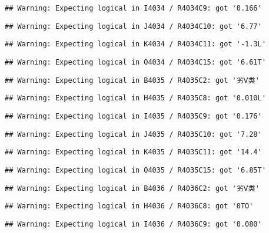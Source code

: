 \documentclass[
]{article}
\begin{document}
\begin{verbatim}
## Warning: Expecting logical in I4034 / R4034C9: got '0.166'
\end{verbatim}

\begin{verbatim}
## Warning: Expecting logical in J4034 / R4034C10: got '6.77'
\end{verbatim}

\begin{verbatim}
## Warning: Expecting logical in K4034 / R4034C11: got '-1.3L'
\end{verbatim}

\begin{verbatim}
## Warning: Expecting logical in O4034 / R4034C15: got '6.61T'
\end{verbatim}

\begin{verbatim}
## Warning: Expecting logical in B4035 / R4035C2: got '劣Ⅴ类'
\end{verbatim}

\begin{verbatim}
## Warning: Expecting logical in H4035 / R4035C8: got '0.010L'
\end{verbatim}

\begin{verbatim}
## Warning: Expecting logical in I4035 / R4035C9: got '0.176'
\end{verbatim}

\begin{verbatim}
## Warning: Expecting logical in J4035 / R4035C10: got '7.28'
\end{verbatim}

\begin{verbatim}
## Warning: Expecting logical in K4035 / R4035C11: got '14.4'
\end{verbatim}

\begin{verbatim}
## Warning: Expecting logical in O4035 / R4035C15: got '6.85T'
\end{verbatim}

\begin{verbatim}
## Warning: Expecting logical in B4036 / R4036C2: got '劣Ⅴ类'
\end{verbatim}

\begin{verbatim}
## Warning: Expecting logical in H4036 / R4036C8: got '0TO'
\end{verbatim}

\begin{verbatim}
## Warning: Expecting logical in I4036 / R4036C9: got '0.080'
\end{verbatim}
\end{document}
